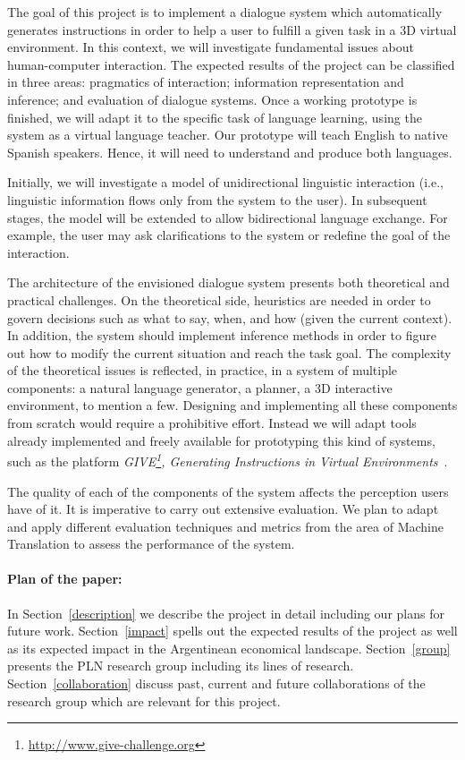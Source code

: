 
The goal of this project is to implement a dialogue system which automatically
generates instructions in order to help a user to fulfill a
given task in a 3D virtual environment. In this context, we will investigate
fundamental issues about human-computer interaction. The expected results of the
project can be classified in three areas: pragmatics
of interaction;  information representation and inference; and evaluation of
dialogue systems. Once a working prototype is finished, we will adapt it to
the specific task of language learning, using the system as a virtual language
teacher. Our prototype will teach English to native Spanish speakers. Hence, it
will need to understand and produce both languages.

Initially, we will investigate a model of unidirectional linguistic
interaction (i.e., linguistic information flows only from the system to the
user). In subsequent stages, the model will be
extended to allow bidirectional language exchange. For example, the user may
ask clarifications to the system or redefine the goal of the interaction.

The architecture of the envisioned dialogue system presents both theoretical and
practical challenges. On the theoretical side, heuristics are needed in order to
govern
decisions such as what to say, when, and how (given the current
context). In addition, the system should implement inference methods in order
to figure out how to modify the current situation and reach the task goal.
The complexity of
the theoretical issues is reflected, in practice, in a system of
multiple components: a natural language generator, a planner,
a 3D interactive environment, to mention a few. Designing
and implementing all these components from scratch would 
require a prohibitive effort. Instead we will adapt tools already implemented 
and freely available for prototyping this kind of 
systems, such as the platform
\emph{GIVE\footnote{\url{http://www.give-challenge.org}}, Generating
Instructions in Virtual
Environments}~\cite{byron09}. 

The quality of each of the components of the system affects the
perception users have of it. It is imperative to carry out 
extensive evaluation. 
We plan to adapt and apply different evaluation techniques and
metrics from the area of Machine Translation to assess the  
performance of the system.

\paragraph{Plan of the paper:} In Section~\ref{description} we describe the project in detail including our plans for future work. Section~\ref{impact} spells out the expected results of the project as well as its expected impact in the Argentinean economical landscape. Section~\ref{group} presents the PLN research group including its lines of research. Section~\ref{collaboration} discuss past, current and future collaborations of the research group which are relevant for this project.
 